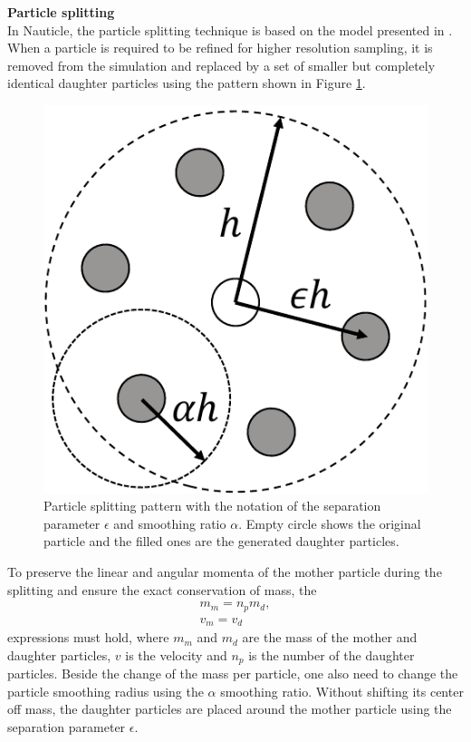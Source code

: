 \documentclass[a4paper,12pt,openany]{book}
\theoremstyle{break}
\begin{document}
\textbf{Particle splitting}\\
In Nauticle, the particle splitting technique is based on the model presented in \cite{Vacondio2013a}. When a particle is required to be refined for higher resolution sampling, it is removed from the simulation and replaced by a set of smaller but completely identical daughter particles using the pattern shown in Figure \ref{fig:splitting}.
\begin{figure}[H]
  \includegraphics[scale=0.6]{particle_splitting_draw.pdf}
  \centering
  \caption{Particle splitting pattern with the notation of the separation parameter $\epsilon$ and smoothing ratio $\alpha$. Empty circle shows the original particle and the filled ones are the generated daughter particles.}
  \label{fig:splitting}
\end{figure}\vspace*{3pt}
To preserve the linear and angular momenta of the mother particle during the splitting and ensure the exact conservation of mass, the
\begin{equation}
\begin{split}
m_m=n_pm_d, \\
v_m=v_d
\end{split}
\end{equation}
expressions must hold, where $m_m$ and $m_d$ are the mass of the mother and daughter particles, $v$ is the velocity and $n_p$ is the number of the daughter particles. Beside the change of the mass per particle, one also need to change the particle smoothing radius using the $\alpha$ smoothing ratio. Without shifting its center off mass, the daughter particles are placed around the mother particle using the separation parameter $\epsilon$.
\end{document}
